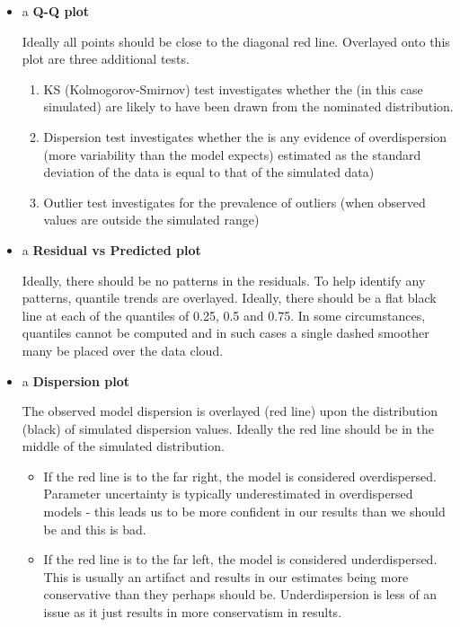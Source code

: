 \documentclass[
  8pt,
  a4paper]{article}
\providecommand{\tightlist}{%
  \setlength{\itemsep}{0pt}\setlength{\parskip}{0pt}}\usepackage{longtable,booktabs,array}
\begin{document}
\begin{itemize}
\item
  a \textbf{Q-Q plot}

  Ideally all points should be close to the diagonal red line. Overlayed
  onto this plot are three additional tests.

  \begin{enumerate}
  \def\labelenumi{\arabic{enumi}.}
  \tightlist
  \item
    KS (Kolmogorov-Smirnov) test investigates whether the (in this case
    simulated) are likely to have been drawn from the nominated
    distribution.
  \item
    Dispersion test investigates whether the is any evidence of
    overdispersion (more variability than the model expects) estimated
    as the standard deviation of the data is equal to that of the
    simulated data)
  \item
    Outlier test investigates for the prevalence of outliers (when
    observed values are outside the simulated range)
  \end{enumerate}
\item
  a \textbf{Residual vs Predicted plot}

  Ideally, there should be no patterns in the residuals. To help
  identify any patterns, quantile trends are overlayed. Ideally, there
  should be a flat black line at each of the quantiles of 0.25, 0.5 and
  0.75. In some circumstances, quantiles cannot be computed and in such
  cases a single dashed smoother many be placed over the data cloud.
\item
  a \textbf{Dispersion plot}

  The observed model dispersion is overlayed (red line) upon the
  distribution (black) of simulated dispersion values. Ideally the red
  line should be in the middle of the simulated distribution.

  \begin{itemize}
  \tightlist
  \item
    If the red line is to the far right, the model is considered
    overdispersed. Parameter uncertainty is typically underestimated in
    overdispersed models - this leads us to be more confident in our
    results than we should be and this is bad.
  \item
    If the red line is to the far left, the model is considered
    underdispersed. This is usually an artifact and results in our
    estimates being more conservative than they perhaps should be.
    Underdispersion is less of an issue as it just results in more
    conservatism in results.
  \end{itemize}
\end{itemize}
\end{document}
